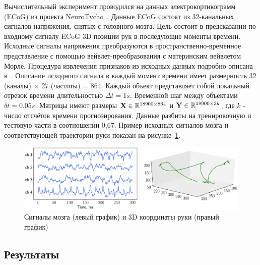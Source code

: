 Вычислительный эксперимент проводился на данных электрокортикограмм (ECoG) из проекта NeuroTycho~\cite{shimoda2012decoding}.
Данные ECoG состоят из 32-канальных сигналов напряжения, снятых с головного мозга.
Цель состоит в предсказании по входному сигналу ECoG 3D позиции рук в последующие моменты времени.
Исходные сигналы напряжения преобразуются в пространственно-временное представление с помощью вейвлет-преобразования с материнским вейвлетом Морле.
Процедура извлечения признаков из исходных данных подробно описана в~\cite{chao2010long,eliseyev2016penalized}.
Описание исходного сигнала в каждый момент времени имеет размерность 32 (каналы) $\times $ 27 (частоты) = 864.
Каждый объект представляет собой локальный отрезок времени длительностью $\Delta t = 1s$. Временной шаг между объектами $\delta t = 0.05 s$.
Матрицы имеют размеры $\mathbf{X} \in \mathbb{R}^{18900 \times 864}$ и $\mathbf{Y} \in \mathbb{R}^{18900 \times 3k}$, где $k$ - число отсчётов времени прогнозирования.
Данные разбиты на тренировочную и тестовую части в соотношении 0,67. 
Пример исходных сигналов мозга и соответствующей траектории руки показан на рисунке~\ref{ch2:fig:ecog_data}.

\begin{figure}
	\centering
	\includegraphics[width=\linewidth]{figs/ch2/ecog_data}
	\caption{Сигналы мозга (левый график) и 3D координаты руки (правый график)}
	\label{ch2:fig:ecog_data}
\end{figure}

\subsection{Результаты}

